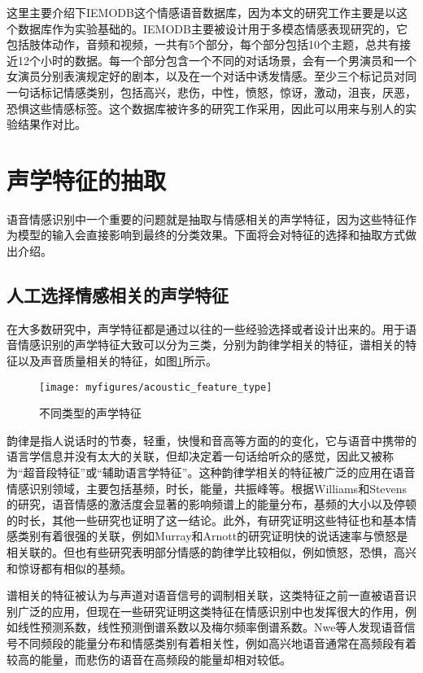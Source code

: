 
这里主要介绍下IEMODB这个情感语音数据库，因为本文的研究工作主要是以这个数据库作为实验基础的。IEMODB主要被设计用于多模态情感表现研究的，它包括肢体动作，音频和视频，一共有5个部分，每个部分包括10个主题，总共有接近12个小时的数据。每一个部分包含一个不同的对话场景，会有一个男演员和一个女演员分别表演规定好的剧本，以及在一个对话中诱发情感。至少三个标记员对同一句话标记情感类别，包括高兴，悲伤，中性，愤怒，惊讶，激动，沮丧，厌恶，恐惧这些情感标签。这个数据库被许多的研究工作采用，因此可以用来与别人的实验结果作对比。

\section{声学特征的抽取}
\label{sec:acoustic_feature_extract}
语音情感识别中一个重要的问题就是抽取与情感相关的声学特征，因为这些特征作为模型的输入会直接影响到最终的分类效果。下面将会对特征的选择和抽取方式做出介绍。

\subsection{人工选择情感相关的声学特征}
\label{ssec:artifical_select}
在大多数研究中，声学特征都是通过以往的一些经验选择或者设计出来的。用于语音情感识别的声学特征大致可以分为三类，分别为韵律学相关的特征，谱相关的特征以及声音质量相关的特征，如图\ref{fig:acoustic_feature_type}所示。

\begin{figure}[htb] %
    \centering
    \texttt{[image: myfigures/acoustic\_feature\_type]}
    \caption{不同类型的声学特征}
    \label{fig:acoustic_feature_type}
\end{figure}

韵律是指人说话时的节奏，轻重，快慢和音高等方面的的变化，它与语音中携带的语言学信息并没有太大的关联，但却决定着一句话给听众的感觉，因此又被称为“超音段特征”或“辅助语言学特征”。这种韵律学相关的特征被广泛的应用在语音情感识别领域，主要包括基频，时长，能量，共振峰等。根据Williams和Stevens的研究，语音情感的激活度会显著的影响频谱上的能量分布，基频的大小以及停顿的时长，其他一些研究也证明了这一结论。此外，有研究证明这些特征也和基本情感类别有着很强的关联，例如Murray和Arnott的研究证明快的说话速率与愤怒是相关联的。但也有些研究表明部分情感的韵律学比较相似，例如愤怒，恐惧，高兴和惊讶都有相似的基频。

谱相关的特征被认为与声道对语音信号的调制相关联，这类特征之前一直被语音识别广泛的应用，但现在一些研究证明这类特征在情感识别中也发挥很大的作用，例如线性预测系数，线性预测倒谱系数以及梅尔频率倒谱系数。Nwe等人发现语音信号不同频段的能量分布和情感类别有着相关性，例如高兴地语音通常在高频段有着较高的能量，而悲伤的语音在高频段的能量却相对较低。

